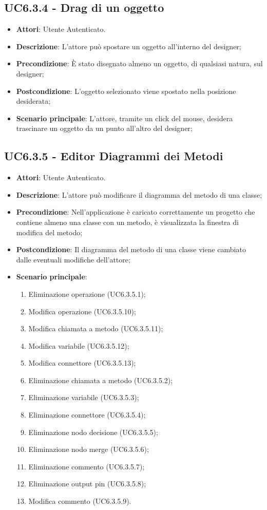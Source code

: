 \subsection{UC6.3.4 - Drag di un oggetto} 
\label{ssec:UC6.3.4} 
\begin{itemize} 
\item \textbf{Attori}: Utente Autenticato.
\item \textbf{Descrizione}: L'attore può spostare un oggetto all'interno del designer;
\item \textbf{Precondizione}: È stato disegnato almeno un oggetto, di qualsiasi natura, sul designer;
\item \textbf{Postcondizione}: L'oggetto selezionato viene spostato nella posizione desiderata;
\item \textbf{Scenario principale}: L'attore, tramite un click del mouse, desidera trascinare un oggetto da un punto all'altro del designer;\end{itemize} 
\subsection{UC6.3.5 - Editor Diagrammi dei Metodi} 
\label{ssec:UC6.3.5} 
\begin{itemize} 
\item \textbf{Attori}: Utente Autenticato.
\item \textbf{Descrizione}: L'attore può modificare il diagramma del metodo di una classe;
\item \textbf{Precondizione}: Nell'applicazione è caricato correttamente un progetto che  contiene almeno una classe con un metodo, è visualizzata la finestra di modifica del metodo;
\item \textbf{Postcondizione}: Il diagramma del metodo di una classe viene cambiato dalle eventuali modifiche dell'attore;
\item \textbf{Scenario principale}: \begin{enumerate}\item Eliminazione operazione (UC6.3.5.1);\item Modifica operazione (UC6.3.5.10);\item Modifica chiamata a metodo (UC6.3.5.11);\item Modifica variabile (UC6.3.5.12);\item Modifica connettore (UC6.3.5.13);\item Eliminazione chiamata a metodo (UC6.3.5.2);\item Eliminazione variabile (UC6.3.5.3);\item Eliminazione connettore (UC6.3.5.4);\item Eliminazione nodo decisione (UC6.3.5.5);\item Eliminazione nodo merge (UC6.3.5.6);\item Eliminazione commento (UC6.3.5.7);\item Eliminazione output pin (UC6.3.5.8);\item Modifica commento (UC6.3.5.9). 
 \end{enumerate}
\end{itemize} 
